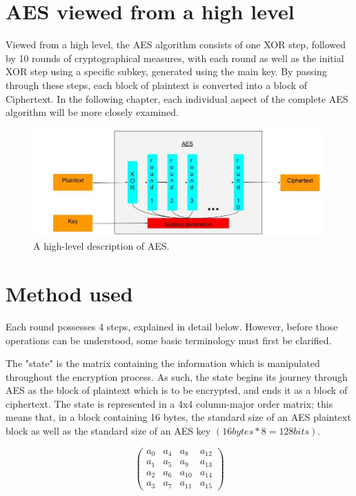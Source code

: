 \documentclass[12pt]{report}
\begin{document}
\section{AES viewed from a high level}

Viewed from a high level, the AES algorithm consists of one XOR step, followed by 10 rounds of cryptographical measures, with each round as well as the initial XOR step using a specific subkey, generated using the main key. By passing through these steps, each block of plaintext is converted into a block of Ciphertext. In the following chapter, each individual aspect of the complete AES algorithm will be more closely examined.

\begin{figure}[H]
\centering
\includegraphics[scale=0.4]{AES_fig1.jpg}
\caption{A high-level description of AES.}
\end{figure}

\section{Method used}
Each round possesses 4 steps, explained in detail below. However, before those operations can be understood, some basic terminology must first be clarified.

The "state" is the matrix containing the information which is manipulated throughout the encryption process. As such, the state begins its journey through AES as the block of plaintext which is to be encrypted, and ends it as a block of ciphertext. The state is represented in a 4x4 column-major order matrix; this means that, in a block containing 16 bytes, the standard size of an AES plaintext block as well as the standard size of an AES key $(16 bytes * 8 = 128 bits)$.

\[ \left( \begin{array}{cccc}
a_0 & a_4 & a_8 & a_{12} \\
a_1 & a_5 & a_9 & a_{13} \\
a_2 & a_6 & a_{10} & a_{14} \\
a_3 & a_7 & a_{11} & a_{15}\end{array} \right)\] 
\end{document}
